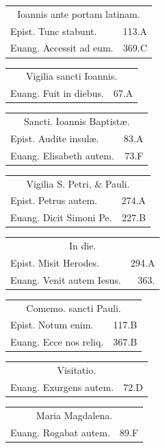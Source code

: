 \documentclass[a5paper,10pt]{book}
\def\ae{æ}
\begin{document}
\begin{multicols}{2}
\begin{tabular}{l r}
\end{tabular}
\begin{tabular}{l r}
\multicolumn{2}{c}{\color{red} Ioannis ante portam latinam.}\\
Epist. Tunc stabunt. & 113.A\\
Euang. Accessit ad eum. & 369.C\\
\end{tabular}
\begin{tabular}{l r}
\multicolumn{2}{c}{\color{red} Vigilia sancti Ioannis.}\\
Euang. Fuit in diebus. & 67.A\\
\end{tabular}
\begin{tabular}{l r}
\multicolumn{2}{c}{\color{red} Sancti. Ioannis Baptist\ae .}\\
Epist. Audite insul\ae . & 83.A\\
Euang. Elisabeth autem. & 73.F\\
\end{tabular}
\begin{tabular}{l r}
\multicolumn{2}{c}{\color{red} Vigilia S. Petri, \& Pauli.}\\
Epist. Petrus autem. & 274.A\\
Euang. Dicit Simoni Pe. & 227.B\\
\end{tabular}
\begin{tabular}{l r}
\multicolumn{2}{c}{\color{red} In die.}\\
Epist. Misit Herodes. & 294.A\\
Euang. Venit autem Iesus. & 363.\\%
\end{tabular}
\begin{tabular}{l r}
\multicolumn{2}{c}{\color{red} Comemo. sancti Pauli.}\\
Epist. Notum enim. & 117.B\\
Euang. Ecce nos reliq. & 367.B\\
\end{tabular}
\begin{tabular}{l r}
\multicolumn{2}{c}{\color{red} Visitatio.}\\
Euang. Exurgens autem. & 72.D\\
\end{tabular}
\begin{tabular}{l r}
\multicolumn{2}{c}{\color{red} Maria Magdalena.}\\
Euang. Rogabat autem. & 89.F\\

\end{tabular}
\end{multicols}
\end{document}
